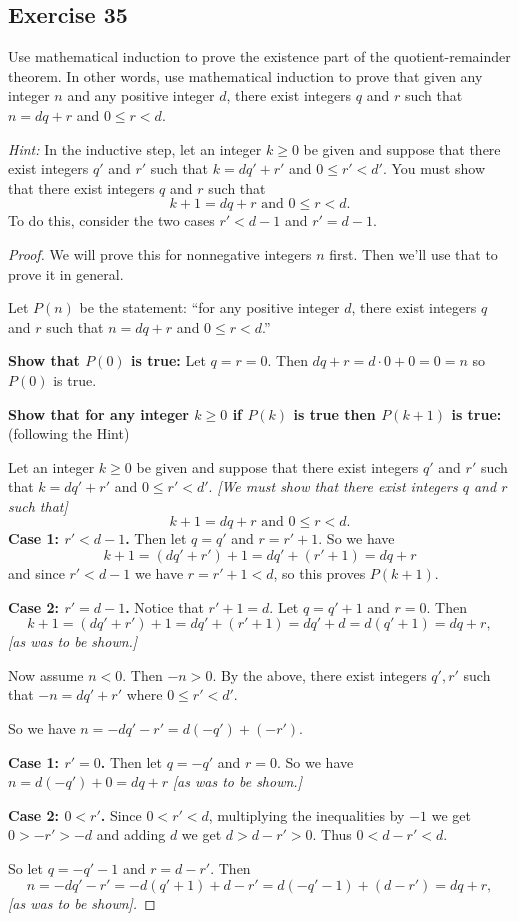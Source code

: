 \documentclass[14pt]{extarticle}
\begin{document}
\subsection{Exercise 35}
Use mathematical induction to prove the existence part of the quotient-remainder theorem. In other words, use mathematical induction to prove that given any integer $n$ and any positive integer $d$, there exist integers $q$ and $r$ such that $n = dq + r$ and $0 \leq r < d$.

    {\it Hint:} In the inductive step, let an integer $k \geq 0$ be given and suppose that there exist integers $q'$ and
$r'$ such that $k = dq' + r'$ and $0 \leq r' < d'.$ You must show that there exist integers $q$ and $r$ such that
\[
    k + 1 = dq + r \text{ and } 0 \leq r < d.
\]
To do this, consider the two cases $r' < d - 1$ and $r' = d - 1$.

\begin{proof}
    We will prove this for nonnegative integers $n$ first. Then we'll use that to prove it in general.

    Let $P(n)$ be the statement: ``for any positive integer $d$, there exist integers $q$ and $r$ such that $n = dq + r$ and $0 \leq r < d$.''

    {\bf Show that $P(0)$ is true:} Let $q = r = 0$. Then $dq + r = d \cdot 0 + 0 = 0 = n$ so $P(0)$ is true.

        {\bf Show that for any integer $k \geq 0$ if $P(k)$ is true then $P(k+1)$ is true:} (following the Hint)

    Let an integer $k \geq 0$ be given and suppose that there exist integers $q'$ and $r'$ such that $k = dq' + r'$ and
    $0 \leq r' < d'.$ {\it [We must show that there exist integers $q$ and $r$ such that]}
    \[
        k + 1 = dq + r \text{ and } 0 \leq r < d.
    \]
    {\bf Case 1: $r' < d - 1$.} Then let $q = q'$ and $r = r'+1$. So we have
    \[
        k+1 = (dq' + r') + 1 = dq' + (r' + 1) = dq + r
    \]
    and since $r' < d-1$ we have $r = r'+1 < d$, so this proves $P(k+1)$.

        {\bf Case 2: $r' = d - 1$.} Notice that $r' + 1 = d$. Let $q = q'+1$ and $r = 0$.  Then
    \[
        k+1 = (dq'+r') + 1 = dq' + (r'+1) = dq'+d = d(q'+1) = dq + r,
    \]
    {\it [as was to be shown.]}

    Now assume $n < 0$. Then $-n > 0$. By the above, there exist integers $q',r'$ such that $-n = dq' + r'$ where $0 \leq r' < d'$.

    So we have $n = -dq' - r' = d(-q') + (-r')$.

        {\bf Case 1: $r' = 0$.} Then let $q = -q'$ and $r = 0$. So we have $n = d(-q') + 0 = dq + r$ {\it [as was to be shown.]}

        {\bf Case 2: $0 < r'$.}
    Since $0 < r' < d$, multiplying the inequalities by
    $-1$ we get $0 > -r' > -d$ and adding $d$ we get
    $d > d - r' > 0$. Thus $0 < d-r' < d$.

    So let $q = -q'-1$ and $r = d-r'$. Then
    \[
        n = -dq' - r' = -d(q'+1) + d - r' = d(-q'-1) + (d-r') = dq + r,
    \]
    {\it [as was to be shown].}
\end{proof}
\end{document}
